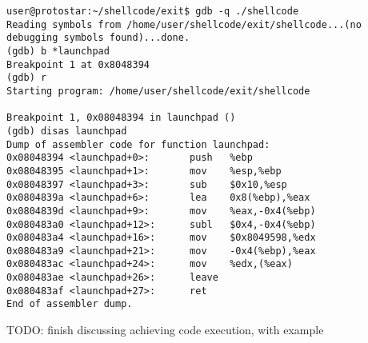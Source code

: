 \begin{lstlisting}
user@protostar:~/shellcode/exit$ gdb -q ./shellcode
Reading symbols from /home/user/shellcode/exit/shellcode...(no debugging symbols found)...done.
(gdb) b *launchpad
Breakpoint 1 at 0x8048394
(gdb) r
Starting program: /home/user/shellcode/exit/shellcode 

Breakpoint 1, 0x08048394 in launchpad ()
(gdb) disas launchpad
Dump of assembler code for function launchpad:
0x08048394 <launchpad+0>:       push   %ebp
0x08048395 <launchpad+1>:       mov    %esp,%ebp
0x08048397 <launchpad+3>:       sub    $0x10,%esp
0x0804839a <launchpad+6>:       lea    0x8(%ebp),%eax
0x0804839d <launchpad+9>:       mov    %eax,-0x4(%ebp)
0x080483a0 <launchpad+12>:      subl   $0x4,-0x4(%ebp)
0x080483a4 <launchpad+16>:      mov    $0x8049598,%edx
0x080483a9 <launchpad+21>:      mov    -0x4(%ebp),%eax
0x080483ac <launchpad+24>:      mov    %edx,(%eax)
0x080483ae <launchpad+26>:      leave  
0x080483af <launchpad+27>:      ret    
End of assembler dump.

\end{lstlisting}

TODO: finish discussing achieving code execution, with example\\
